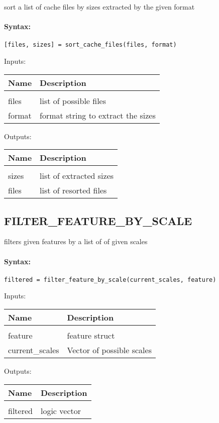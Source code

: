 sort a list of cache files by sizes extracted by the given format

\paragraph{Syntax:} \verb|[files, sizes] = sort_cache_files(files, format)|

Inputs:

\begin{tabular}{|l|p{5cm}|}
\hline
\textbf{Name} & \textbf{Description} \\
\hline \hline \\
files & list of possible files  \\ \hline
format & format string to extract the sizes  \\ \hline
\end{tabular}
Outputs:

\begin{tabular}{|l|p{5cm}|}
\hline
\textbf{Name} & \textbf{Description} \\
\hline \hline \\
sizes & list of extracted sizes  \\ \hline
files & list of resorted files  \\ \hline
\end{tabular}

\subsection{FILTER\_FEATURE\_BY\_SCALE}

filters given features by a list of of given scales

\paragraph{Syntax:} \verb|filtered = filter_feature_by_scale(current_scales, feature)|

Inputs:

\begin{tabular}{|l|p{5cm}|}
\hline
\textbf{Name} & \textbf{Description} \\
\hline \hline \\
feature & feature struct  \\ \hline
current\_scales & Vector of possible scales  \\ \hline
\end{tabular}
Outputs:

\begin{tabular}{|l|p{5cm}|}
\hline
\textbf{Name} & \textbf{Description} \\
\hline \hline \\
filtered & logic vector  \\ \hline
\end{tabular}

